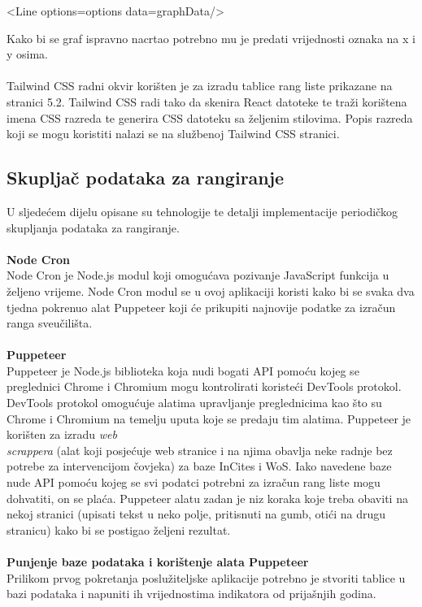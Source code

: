 \documentclass[times, utf8, zavrsni]{fer}
\begin{document}
\begin{verbnobox}[\fontsize{10pt}{10pt}\selectfont]
<Line options={options} data={graphData}/>
\end{verbnobox}
Kako bi se graf ispravno nacrtao potrebno mu je predati vrijednosti oznaka na x i y osima.
\\\\Tailwind CSS radni okvir korišten je za izradu tablice rang liste prikazane na stranici 5.2. Tailwind CSS radi tako da skenira React datoteke 
te traži korištena imena CSS razreda te generira CSS datoteku sa željenim stilovima. Popis razreda koji se mogu koristiti nalazi se na službenoj
Tailwind CSS stranici.
\\ \subsection{Skupljač podataka za rangiranje}
U sljedećem dijelu opisane su tehnologije te detalji implementacije periodičkog \\skupljanja podataka za rangiranje.
\\\\\textbf{Node Cron}
\\ Node Cron je Node.js modul koji omogućava pozivanje JavaScript funkcija u željeno vrijeme. Node Cron modul se u ovoj 
aplikaciji koristi kako bi se svaka dva tjedna pokrenuo alat Puppeteer koji će prikupiti najnovije podatke za izračun ranga sveučilišta.
\\ \\ \textbf{Puppeteer}
\\ Puppeteer je Node.js biblioteka koja nudi bogati API pomoću kojeg se preglednici Chrome i Chromium mogu kontrolirati koristeći DevTools protokol.
DevTools protokol omogućuje alatima upravljanje preglednicima kao što su Chrome i Chromium na temelju uputa koje se predaju tim alatima.
Puppeteer je korišten za izradu \emph{web \\scrappera} (alat koji posjećuje web stranice i 
na njima obavlja neke radnje bez potrebe za intervencijom čovjeka) za baze InCites i WoS. Iako navedene baze nude API pomoću kojeg se svi
podatci potrebni za izračun rang liste mogu dohvatiti, on se plaća. Puppeteer alatu zadan je niz koraka koje treba obaviti na nekoj stranici (upisati tekst u neko polje, pritisnuti na gumb, otići na drugu stranicu)
kako bi se postigao željeni rezultat.
\\\\\textbf{Punjenje baze podataka i korištenje alata Puppeteer}
\\Prilikom prvog pokretanja poslužiteljske aplikacije potrebno je stvoriti tablice u bazi podataka i napuniti ih vrijednostima indikatora od prijašnjih godina.
\end{document}
